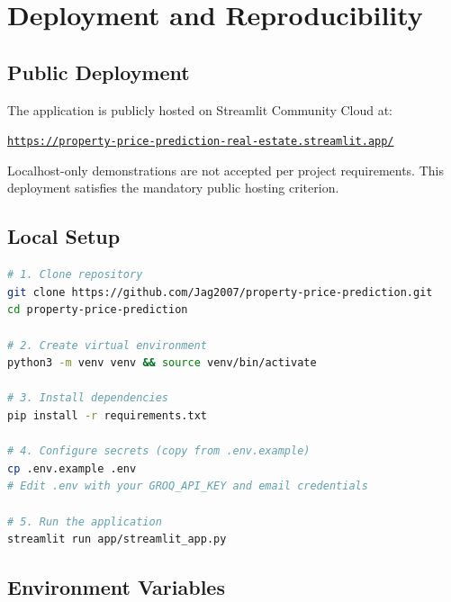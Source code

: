 \documentclass[12pt,a4paper]{article}
\begin{document}
\section{Deployment and Reproducibility}

\subsection{Public Deployment}

The application is publicly hosted on Streamlit Community Cloud at:

\begin{center}
\href{https://property-price-prediction-real-estate.streamlit.app/}{\texttt{https://property-price-prediction-real-estate.streamlit.app/}}
\end{center}

Localhost-only demonstrations are not accepted per project requirements. This deployment satisfies the mandatory public hosting criterion.

\subsection{Local Setup}

\begin{lstlisting}[language=bash, caption={Local installation and run commands}]
# 1. Clone repository
git clone https://github.com/Jag2007/property-price-prediction.git
cd property-price-prediction

# 2. Create virtual environment
python3 -m venv venv && source venv/bin/activate

# 3. Install dependencies
pip install -r requirements.txt

# 4. Configure secrets (copy from .env.example)
cp .env.example .env
# Edit .env with your GROQ_API_KEY and email credentials

# 5. Run the application
streamlit run app/streamlit_app.py
\end{lstlisting}

\subsection{Environment Variables}
\end{document}
